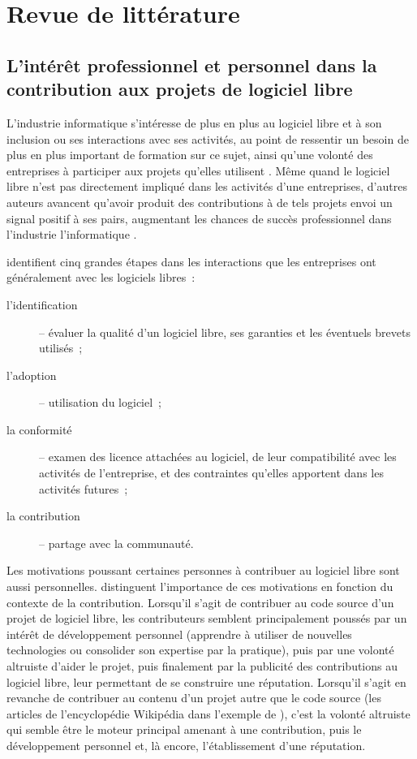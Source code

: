 \chapter{Revue de littérature}

\section{L'intérêt professionnel et personnel dans la contribution aux projets de logiciel libre}

L'industrie informatique s'intéresse de plus en plus au logiciel libre et à son inclusion ou ses interactions
avec ses activités, au point de ressentir un besoin de plus en plus important de formation sur ce sujet, ainsi
qu'une volonté des entreprises à participer aux projets qu'elles utilisent .
Même quand le logiciel libre n'est pas directement impliqué dans les activités d'une entreprises, d'autres
auteurs avancent qu'avoir produit des contributions à de tels projets envoi un signal positif à ses pairs,
augmentant les chances de succès professionnel dans l'industrie l'informatique
.

\textcite{strategies-2012} identifient cinq grandes étapes dans les interactions que les entreprises ont
généralement avec les logiciels libres :
\begin{description}
    \item[l'identification] -- évaluer la qualité d'un logiciel libre, ses garanties et les éventuels brevets
        utilisés ;
    \item[l'adoption] -- utilisation du logiciel ;
    \item[la conformité] -- examen des licence attachées au logiciel, de leur compatibilité avec les activités
        de l'entreprise, et des contraintes qu'elles apportent dans les activités futures ;
    \item[la contribution] -- partage avec la communauté.
\end{description}

Les motivations poussant certaines personnes à contribuer au logiciel libre sont aussi personnelles.
 distinguent l'importance de ces motivations en fonction du contexte
de la contribution. Lorsqu'il s'agit de contribuer au code source d'un projet de logiciel libre, les
contributeurs semblent principalement poussés par un intérêt de développement personnel (apprendre à utiliser
de nouvelles technologies ou consolider son expertise par la pratique), puis par une volonté altruiste d'aider
le projet, puis finalement par la publicité des contributions au logiciel libre, leur permettant de se
construire une réputation. Lorsqu'il s'agit en revanche de contribuer au contenu d'un projet autre que le code
source (les articles de l'encyclopédie Wikipédia dans l'exemple de \textcite{os-personal-interests-2008}),
c'est la volonté altruiste qui semble être le moteur principal amenant à une contribution, puis le
développement personnel et, là encore, l'établissement d'une réputation.

